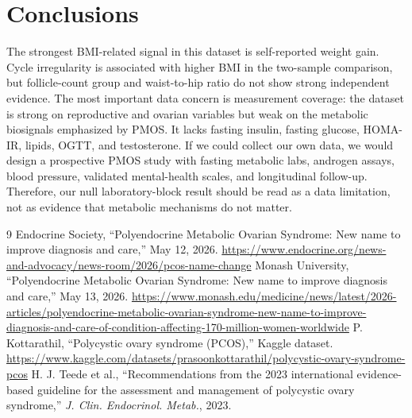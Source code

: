 \documentclass[11pt]{article}
\begin{document}
\section{Conclusions}
The strongest BMI-related signal in this dataset is self-reported weight gain. Cycle irregularity is associated with higher BMI in the two-sample comparison, but follicle-count group and waist-to-hip ratio do not show strong independent evidence. The most important data concern is measurement coverage: the dataset is strong on reproductive and ovarian variables but weak on the metabolic biosignals emphasized by PMOS. It lacks fasting insulin, fasting glucose, HOMA-IR, lipids, OGTT, and testosterone. If we could collect our own data, we would design a prospective PMOS study with fasting metabolic labs, androgen assays, blood pressure, validated mental-health scales, and longitudinal follow-up. Therefore, our null laboratory-block result should be read as a data limitation, not as evidence that metabolic mechanisms do not matter.

\begin{thebibliography}{9}
 Endocrine Society, ``Polyendocrine Metabolic Ovarian Syndrome: New name to improve diagnosis and care,'' May 12, 2026. \url{https://www.endocrine.org/news-and-advocacy/news-room/2026/pcos-name-change}
 Monash University, ``Polyendocrine Metabolic Ovarian Syndrome: New name to improve diagnosis and care,'' May 13, 2026. \url{https://www.monash.edu/medicine/news/latest/2026-articles/polyendocrine-metabolic-ovarian-syndrome-new-name-to-improve-diagnosis-and-care-of-condition-affecting-170-million-women-worldwide}
 P. Kottarathil, ``Polycystic ovary syndrome (PCOS),'' Kaggle dataset. \url{https://www.kaggle.com/datasets/prasoonkottarathil/polycystic-ovary-syndrome-pcos}
 H. J. Teede et al., ``Recommendations from the 2023 international evidence-based guideline for the assessment and management of polycystic ovary syndrome,'' \textit{J. Clin. Endocrinol. Metab.}, 2023.
\end{thebibliography}
\end{document}
